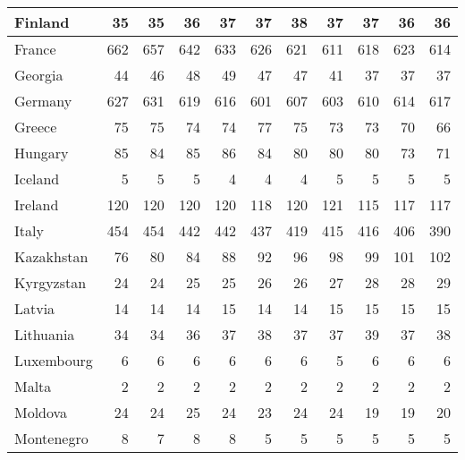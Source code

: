 \begin{table}
\begin{tabular}{|l|r|r|r|r|r|r|r|r|r|r|}
                       Finland&     35&     35&     36&     37&     37&     38&     37&     37&     36&     36\\\hline
                        France&    662&    657&    642&    633&    626&    621&    611&    618&    623&    614\\\hline
                       Georgia&     44&     46&     48&     49&     47&     47&     41&     37&     37&     37\\\hline
                       Germany&    627&    631&    619&    616&    601&    607&    603&    610&    614&    617\\\hline
                        Greece&     75&     75&     74&     74&     77&     75&     73&     73&     70&     66\\\hline
                       Hungary&     85&     84&     85&     86&     84&     80&     80&     80&     73&     71\\\hline
                       Iceland&      5&      5&      5&      4&      4&      4&      5&      5&      5&      5\\\hline
                       Ireland&    120&    120&    120&    120&    118&    120&    121&    115&    117&    117\\\hline
                         Italy&    454&    454&    442&    442&    437&    419&    415&    416&    406&    390\\\hline
                    Kazakhstan&     76&     80&     84&     88&     92&     96&     98&     99&    101&    102\\\hline
                    Kyrgyzstan&     24&     24&     25&     25&     26&     26&     27&     28&     28&     29\\\hline
                        Latvia&     14&     14&     14&     15&     14&     14&     15&     15&     15&     15\\\hline
                     Lithuania&     34&     34&     36&     37&     38&     37&     37&     39&     37&     38\\\hline
                    Luxembourg&      6&      6&      6&      6&      6&      6&      5&      6&      6&      6\\\hline
                         Malta&      2&      2&      2&      2&      2&      2&      2&      2&      2&      2\\\hline
                       Moldova&     24&     24&     25&     24&     23&     24&     24&     19&     19&     20\\\hline
                    Montenegro&      8&      7&      8&      8&      5&      5&      5&      5&      5&      5\\\hline

\end{tabular}
\end{table}
